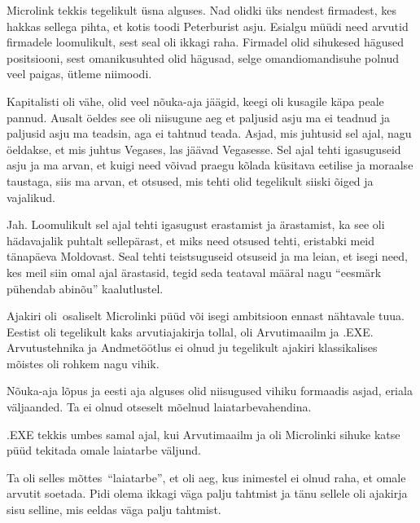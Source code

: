 Microlink tekkis tegelikult üsna alguses. Nad olidki üks nendest firmadest, kes hakkas sellega pihta, et kotis toodi Peterburist asju. Esialgu müüdi need arvutid firmadele loomulikult, sest seal oli ikkagi raha. Firmadel olid sihukesed hägused positsiooni, sest omanikusuhted olid hägusad, selge omandiomandisuhe polnud veel paigas, ütleme niimoodi.


Kapitalisti oli vähe, olid veel nõuka-aja jäägid, keegi oli kusagile käpa peale pannud. Ausalt öeldes see oli niisugune aeg et paljusid asju ma ei teadnud ja paljusid asju ma teadsin, aga ei tahtnud teada. Asjad, mis juhtusid sel ajal, nagu öeldakse, et mis juhtus Vegases, las jäävad Vegasesse. Sel ajal tehti igasuguseid asju ja ma arvan, et kuigi need võivad praegu kõlada küsitava eetilise ja moraalse taustaga, siis ma arvan, et otsused, mis tehti olid tegelikult siiski õiged ja vajalikud.


Jah. Loomulikult sel ajal tehti igasugust erastamist ja ärastamist, ka see oli hädavajalik puhtalt sellepärast, et miks need otsused tehti, eristabki meid tänapäeva  Moldovast. Seal tehti teistsuguseid otsuseid ja ma leian, et isegi need, kes meil siin omal ajal ärastasid, tegid seda teataval määral nagu \enquote{eesmärk pühendab abinõu} kaalutlustel.


Ajakiri oli osaliselt Microlinki püüd või isegi ambitsioon ennast nähtavale tuua.  Eestist oli tegelikult kaks arvutiajakirja tollal, oli Arvutimaailm ja .EXE. Arvutustehnika ja Andmetöötlus ei olnud ju tegelikult ajakiri klassikalises mõistes oli rohkem nagu vihik.

Nõuka-aja lõpus ja eesti  aja alguses olid niisugused vihiku formaadis asjad, eriala väljaanded. Ta ei olnud otseselt mõelnud laiatarbevahendina.

.EXE tekkis umbes samal ajal, kui Arvutimaailm ja oli Microlinki sihuke katse püüd tekitada omale laiatarbe väljund.


Ta oli selles mõttes \enquote{laiatarbe}, et oli aeg, kus inimestel ei olnud raha, et omale arvutit soetada. Pidi olema ikkagi väga palju tahtmist ja tänu sellele oli ajakirja sisu selline, mis eeldas väga palju tahtmist. 


